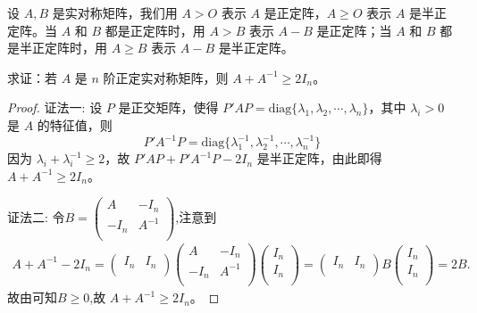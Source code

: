 \documentclass[../../main.tex]{subfiles}
\begin{document}
\begin{definition}[正定阵和半正定阵的记号]
设 \(A,B\) 是实对称矩阵，我们用 \(A > O\) 表示 \(A\) 是正定阵，\(A \geqslant  O\) 表示 \(A\) 是半正定阵。当 \(A\) 和 \(B\) 都是正定阵时，用 \(A > B\) 表示 \(A - B\) 是正定阵；当 \(A\) 和 \(B\) 都是半正定阵时，用 \(A \geqslant  B\) 表示 \(A - B\) 是半正定阵。 
\end{definition}

\begin{example}\label{proposition:例9.59}
求证：若 \(A\) 是 \(n\) 阶正定实对称矩阵，则 \(A + A^{-1} \geqslant  2I_n\)。
\end{example}
\begin{proof}
{\color{blue}证法一:}
设 \(P\) 是正交矩阵，使得 \(P'AP = \mathrm{diag}\{\lambda_1,\lambda_2,\cdots,\lambda_n\}\)，其中 \(\lambda_i > 0\) 是 \(A\) 的特征值，则
\[
P'A^{-1}P = \mathrm{diag}\{\lambda_1^{-1},\lambda_2^{-1},\cdots,\lambda_n^{-1}\}
\]
因为 \(\lambda_i + \lambda_i^{-1} \geqslant  2\)，故 \(P'AP + P'A^{-1}P - 2I_n\) 是半正定阵，由此即得 \(A + A^{-1} \geqslant  2I_n\)。

{\color{blue}证法二:}
令$B=\left( \begin{matrix}
A&		-I_n\\
-I_n&		A^{-1}\\
\end{matrix} \right) $,注意到
\begin{align*}
A+A^{-1}-2I_n=\left( \begin{matrix}
I_n&		I_n\\
\end{matrix} \right) \left( \begin{matrix}
A&		-I_n\\
-I_n&		A^{-1}\\
\end{matrix} \right) \left( \begin{array}{c}
I_n\\
I_n\\
\end{array} \right) =\left( \begin{matrix}
I_n&		I_n\\
\end{matrix} \right) B\left( \begin{array}{c}
I_n\\
I_n\\
\end{array} \right) =2B.
\end{align*}
故由可知$B\geqslant  0$,故 \(A + A^{-1} \geqslant  2I_n\)。 

\end{proof}
\end{document}

